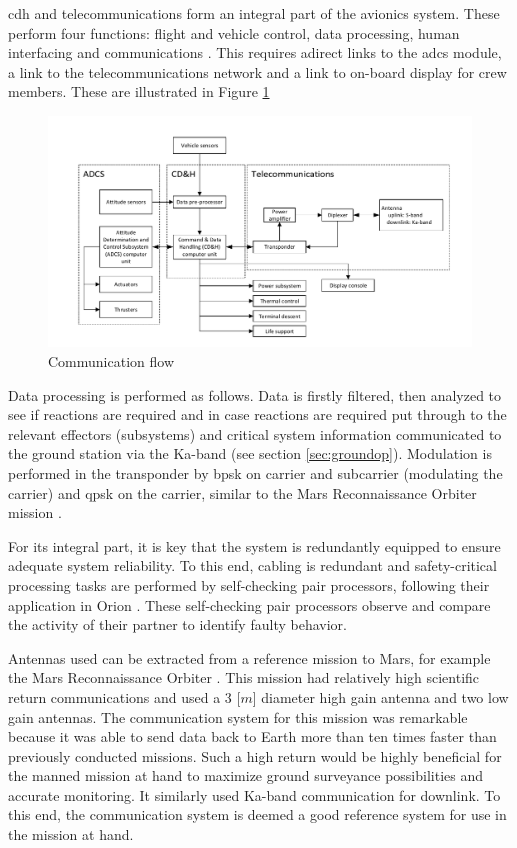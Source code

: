 \acrfull{cdh} and telecommunications form an integral part of the avionics system. These perform four functions: flight and vehicle control, data processing, human interfacing and communications \cite{Eger2008}. This requires adirect links to the \gls{adcs} module, a link to the telecommunications network and a link to on-board display for crew members. These are illustrated in Figure \ref{fig:cdhflow}

\begin{figure}[h]
		\centering
		\includegraphics[width=1.0\textwidth]{./Figure/CrewModule/CDH.pdf}
		\vspace{-12mm}
		\caption{Communication flow}
		\label{fig:cdhflow}
\end{figure}

Data processing is performed as follows. Data is firstly filtered, then analyzed to see if reactions are required and in case reactions are required put through to the relevant effectors (subsystems) and critical system information communicated to the ground station via the Ka-band (see section \ref{sec:groundop}). Modulation is performed in the transponder by \gls{bpsk} on carrier and subcarrier (modulating the carrier) and \gls{qpsk} on the carrier, similar to the Mars Reconnaissance Orbiter mission \cite{Taylor2006}.

For its integral part, it is key that the system is redundantly equipped to ensure adequate system reliability. To this end, cabling is redundant and safety-critical processing tasks are performed by self-checking pair processors, following their application in Orion \cite{Eger2008}. These self-checking pair processors observe and compare the activity of their partner to identify faulty behavior. 

Antennas used can be extracted from a reference mission to Mars, for example the Mars Reconnaissance Orbiter \cite{Taylor2006}. This mission had relatively high scientific return communications and used a 3 [$m$] diameter high gain antenna and two low gain antennas. The communication system for this mission was remarkable because it was able to send data back to Earth more than ten times faster than previously conducted missions. Such a high return would be highly beneficial for the manned mission at hand to maximize ground surveyance possibilities and accurate monitoring. It similarly used Ka-band communication for downlink. To this end, the communication system is deemed a good reference system for use in the mission at hand.

